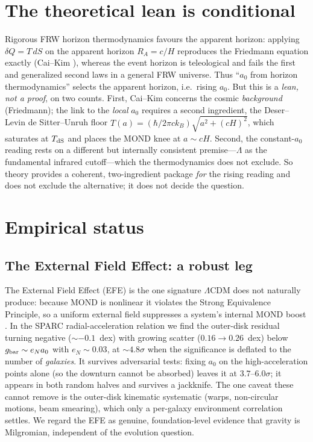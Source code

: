 \documentclass[11pt]{article}
\newcommand{\az}{a_0}
\begin{document}
\section{The theoretical lean is conditional}
Rigorous FRW horizon thermodynamics favours the apparent horizon: applying $\delta Q=T\,dS$ on the
apparent horizon $R_A=c/H$ reproduces the Friedmann equation exactly (Cai--Kim \cite{caikim2005}),
whereas the event horizon is teleological and fails the first and generalized second laws in a general
FRW universe. Thus ``$\az$ from horizon thermodynamics'' selects the apparent horizon, i.e.\ rising
$\az$. But this is a \emph{lean, not a proof}, on two counts. First, Cai--Kim concerns the cosmic
\emph{background} (Friedmann); the link to the \emph{local} $\az$ requires a second ingredient, the
Deser--Levin \cite{deserlevin1997} de Sitter--Unruh floor $T(a)=(\hbar/2\pi ck_B)\sqrt{a^2+(cH)^2}$,
which saturates at $T_{\rm dS}$ and places the MOND knee at $a\sim cH$. Second, the constant-$\az$
reading rests on a different but internally consistent premise---$\Lambda$ as the fundamental infrared
cutoff---which the thermodynamics does not exclude. So theory provides a coherent, two-ingredient
package \emph{for} the rising reading and does not exclude the alternative; it does not decide the
question.

\section{Empirical status}
\subsection{The External Field Effect: a robust leg}
The External Field Effect (EFE) is the one signature $\Lambda$CDM does not naturally produce: because
MOND is nonlinear it violates the Strong Equivalence Principle, so a uniform external field suppresses a
system's internal MOND boost \cite{chae2020}. In the SPARC radial-acceleration relation
\cite{lelli2016} we find the outer-disk residual turning negative ($\sim$$-0.1$~dex) with growing
scatter ($0.16\!\to\!0.26$~dex) below $g_{\rm bar}\sim e_N\az$ with $e_N\sim0.03$, at
$\sim4.8\sigma$ when the significance is deflated to the number of \emph{galaxies}. It survives
adversarial tests: fixing $\az$ on the high-acceleration points alone (so the downturn cannot be
absorbed) leaves it at $3.7$--$6.0\sigma$; it appears in both random halves and survives a jackknife.
The one caveat these cannot remove is the outer-disk kinematic systematic (warps, non-circular motions,
beam smearing), which only a per-galaxy environment correlation settles. We regard the EFE as genuine,
foundation-level evidence that gravity is Milgromian, independent of the evolution question.
\end{document}
